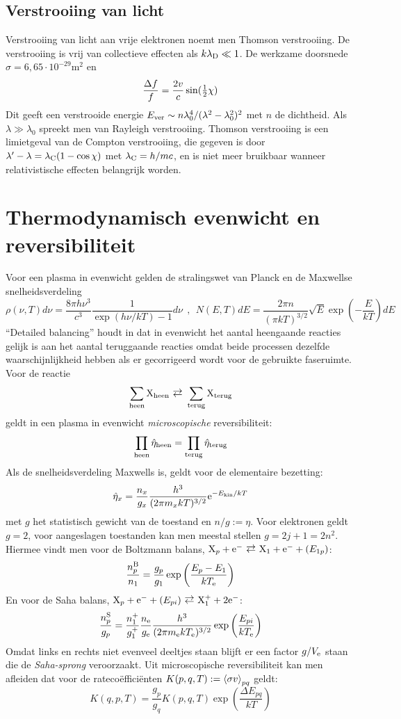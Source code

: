 \documentclass[twoside]{report}
\begin{document}
\subsection{Verstrooiing van licht}
Verstrooiing van licht aan vrije elektronen noemt men Thomson verstrooiing.
De verstrooiing is vrij van collectieve effecten als $k\lambda_{\rm D}\ll1$.
De werkzame doorsnede $\sigma=6,65\cdot10^{-29}$m$^2$ en
\[
\frac{\Delta f}{f}=\frac{2v}{c}\sin(\mbox{$\frac{1}{2}$}\chi)
\]
Dit geeft een verstrooide energie
$E_{\rm ver}\sim n\lambda_0^4/(\lambda^2-\lambda_0^2)^2$ met $n$ de dichtheid.
Als $\lambda\gg\lambda_0$ spreekt men van Rayleigh verstrooiing. Thomson
verstrooiing is een limietgeval van de Compton verstrooiing, die gegeven is
door $\lambda'-\lambda=\lambda_{\rm C}(1-\cos\chi)$ met $\lambda_{\rm C}=h/mc$,
en is niet meer bruikbaar wanneer relativistische effecten belangrijk worden.

\section{Thermodynamisch evenwicht en reversibiliteit}
Voor een plasma in evenwicht gelden de stralingswet van Planck en de
Maxwellse snelheidsverdeling
\[
\rho(\nu,T)d\nu=\frac{8\pi h\nu^3}{c^3}\frac{1}{\exp(h\nu/kT)-1}d\nu~~,~~
N(E,T)dE=\frac{2\pi n}{(\pi kT)^{3/2}}\sqrt{E}\exp\left(-\frac{E}{kT}\right)dE
\]
``Detailed balancing'' houdt in dat in evenwicht het aantal heengaande
reacties gelijk is aan het aantal teruggaande reacties omdat beide processen
dezelfde waarschijnlijkheid hebben als er gecorrigeerd wordt voor de gebruikte
faseruimte. Voor de reactie
\[
\sum_{\rm heen}{\rm X}_{\rm heen}\rlarrow\sum_{\rm terug}{\rm X}_{\rm terug}
\]
geldt in een plasma in evenwicht {\it microscopische} reversibiliteit:
\[
\prod_{\rm heen}\hat{\eta}_{\rm heen}=\prod_{\rm terug}\hat{\eta}_{\rm terug}
\]
Als de snelheidsverdeling Maxwells is, geldt voor de elementaire bezetting:
\[
\hat{\eta}_{x}=\frac{n_x}{g_x}\frac{h^3}{(2\pi m_xkT)^{3/2}}{\rm e}^{-E_{\rm kin}/kT}
\]
met $g$ het statistisch gewicht van de toestand en $n/g:=\eta$. Voor
elektronen geldt $g=2$, voor aangeslagen toestanden kan men meestal stellen
$g=2j+1=2n^2$.
\npar
Hiermee vindt men voor de Boltzmann balans,
${\rm X}_p+{\rm e}^-\rlarrow{\rm X}_1+{\rm e}^-+(E_{1p})$:
\[
\frac{n_p^{\rm B}}{n_1}=\frac{g_p}{g_1}\exp\left(\frac{E_p-E_1}{kT_{\rm e}}\right)
\]
En voor de Saha balans,
${\rm X}_p+{\rm e}^-+(E_{pi})\rlarrow{\rm X}_1^++2{\rm e}^-$:
\[
\frac{n_p^{\rm S}}{g_p}=\frac{n_1^+}{g_1^+}\frac{n_{\rm e}}{g_{\rm e}}
\frac{h^3}{(2\pi m_{\rm e} kT_{\rm e})^{3/2}}\exp\left(\frac{E_{pi}}{kT_{\rm e}}\right)
\]
Omdat links en rechts niet evenveel deeltjes staan blijft er een factor
$g/V_{\rm e}$ staan die de {\it Saha-sprong} veroorzaakt.
\npar
Uit microscopische reversibiliteit kan men afleiden dat voor de
rateco\"effici\"enten $K(p,q,T):=\left\langle \sigma v \right\rangle_{pq}$ geldt:
\[
K(q,p,T)=\frac{g_p}{g_q}K(p,q,T)\exp\left(\frac{\Delta E_{pq}}{kT}\right)
\]
\end{document}
